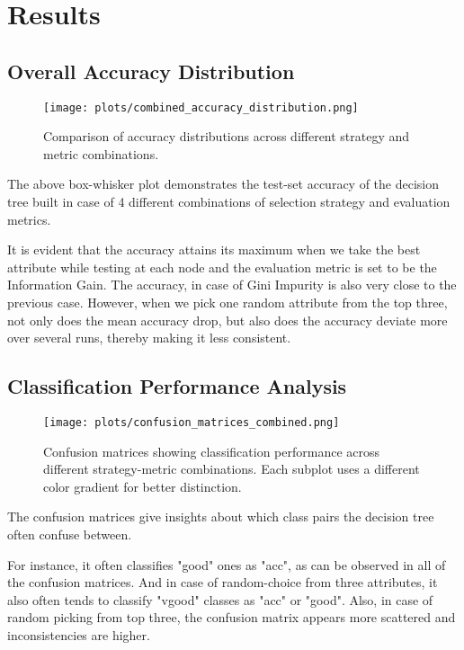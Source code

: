 \documentclass[12pt]{article}
\begin{document}
\section{Results} 

\subsection{Overall Accuracy Distribution}
\begin{figure}[H]
    \centering
    \texttt{[image: plots/combined\_accuracy\_distribution.png]}
    \caption{Comparison of accuracy distributions across different strategy and metric combinations.}
    \label{fig:combined-accuracy}
\end{figure}

The above box-whisker plot demonstrates the test-set accuracy of the decision tree built in case of 4 different combinations of selection strategy and evaluation metrics.

It is evident that the accuracy attains its maximum when we take the best attribute while testing at each node and the evaluation metric is set to be the Information Gain. The accuracy, in case of Gini Impurity is also very close to the previous case. However, when we pick one random attribute from the top three, not only does the mean accuracy drop, but also does the accuracy deviate more over several runs, thereby making it less consistent.

\newpage

\subsection{Classification Performance Analysis}
\begin{figure}[H]
    \centering
    \texttt{[image: plots/confusion\_matrices\_combined.png]}
    \caption{Confusion matrices showing classification performance across different strategy-metric combinations. Each subplot uses a different color gradient for better distinction.}
    \label{fig:confusion-matrices}
\end{figure}

The confusion matrices give insights about which class pairs the decision tree often confuse between.

For instance, it often classifies "good" ones as "acc", as can be observed in all of the confusion matrices. And in case of random-choice from three attributes, it also often tends to classify "vgood" classes as "acc" or "good". Also, in case of random picking from top three, the confusion matrix appears more scattered and inconsistencies are higher.
\end{document}
